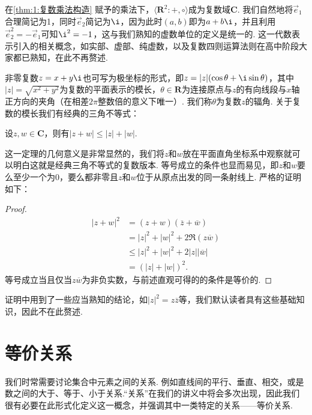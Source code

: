 在\autoref{thm:1:复数乘法构造} 赋予的乘法下，$\langle\mathbf{R}^2:+,\circ\rangle$成为复数域$\mathbf{C}$. 我们自然地将$\vec{e}_1$合理简记为1，同时$\vec{e}_2$简记为$\i$，因为此时$(a,b)$即为$a+b\i$，并且利用$\vec{e}_2^2=-\vec{e}_1$可知$\i^2=-1$，这与我们熟知的虚数单位的定义是统一的. 这一代数表示引入的相关概念，如实部、虚部、纯虚数，以及复数四则运算法则在高中阶段大家都已熟知，在此不再赘述.

非零复数$z=x+y\i$也可写为极坐标的形式，即$z=|z|(\cos\theta+\i\sin\theta)$，其中$|z|=\sqrt{x^2+y^2}$为复数的平面表示的模长，$\theta\in\mathbf{R}$为连接原点与$z$的有向线段与$x$轴正方向的夹角（在相差$2\pi$整数倍的意义下唯一）. 我们称$\theta$为复数$z$的辐角. 关于复数的模长我们有经典的三角不等式：
\begin{theorem}
    设$z,w\in\mathbf{C}$，则有$|z+w|\leqslant|z|+|w|$.
\end{theorem}

这一定理的几何意义是非常显然的，我们将$z$和$w$放在平面直角坐标系中观察就可以明白这就是经典三角不等式的复数版本. 等号成立的条件也显而易见，即$z$和$w$要么至少一个为0，要么都非零且$z$和$w$位于从原点出发的同一条射线上. 严格的证明如下：

\begin{proof}
    \begin{align*}
        |z+w|^2 & =(z+w)(\overline{z}+\overline{w})       \\
                & =|z|^2+|w|^2+2\Re(z\overline{w})        \\
                & \leqslant|z|^2+|w|^2+2|z||\overline{w}| \\
                & =(|z|+|w|)^2.
    \end{align*}
    等号成立当且仅当$z\overline{w}$为非负实数，与前述直观可得的的条件是等价的.
\end{proof}

证明中用到了一些应当熟知的结论，如$|z|^2=z\overline{z}$等，我们默认读者具有这些基础知识，因此不在此赘述.

\section{等价关系}

我们时常需要讨论集合中元素之间的关系. 例如直线间的平行、垂直、相交，或是数之间的大于、等于、小于关系.``关系''在我们的讲义中将会多次出现，因此我们很有必要在此形式化定义这一概念，并强调其中一类特定的关系——等价关系.

